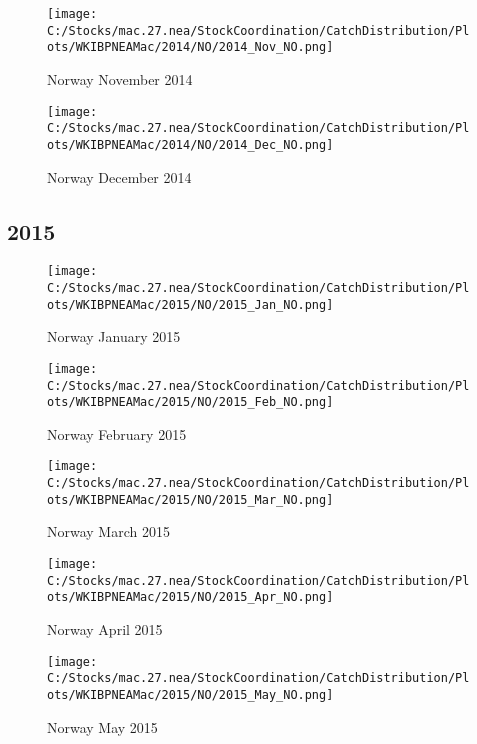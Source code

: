 \documentclass{article}
\begin{document}
\begin{figure}
	\centering
		\texttt{[image: C:/Stocks/mac.27.nea/StockCoordination/CatchDistribution/Plots/WKIBPNEAMac/2014/NO/2014\_Nov\_NO.png]}
	\caption{Norway November 2014}
	\label{fig:2014_Nov_NO}
\end{figure}

\begin{figure}
	\centering
		\texttt{[image: C:/Stocks/mac.27.nea/StockCoordination/CatchDistribution/Plots/WKIBPNEAMac/2014/NO/2014\_Dec\_NO.png]}
	\caption{Norway December 2014}
	\label{fig:2014_Dec_NO}
\end{figure}

\clearpage

\newpage

\subsection{2015}



\begin{figure}[h]
	\centering
		\texttt{[image: C:/Stocks/mac.27.nea/StockCoordination/CatchDistribution/Plots/WKIBPNEAMac/2015/NO/2015\_Jan\_NO.png]}
	\caption{Norway January 2015}
	\label{fig:2015_Jan_NO}
\end{figure}

\begin{figure}
	\centering
		\texttt{[image: C:/Stocks/mac.27.nea/StockCoordination/CatchDistribution/Plots/WKIBPNEAMac/2015/NO/2015\_Feb\_NO.png]}
	\caption{Norway February 2015}
	\label{fig:2015_Feb_NO}
\end{figure}

\begin{figure}
	\centering
		\texttt{[image: C:/Stocks/mac.27.nea/StockCoordination/CatchDistribution/Plots/WKIBPNEAMac/2015/NO/2015\_Mar\_NO.png]}
	\caption{Norway March 2015}
	\label{fig:2015_Mar_NO}
\end{figure}

\begin{figure}
	\centering
		\texttt{[image: C:/Stocks/mac.27.nea/StockCoordination/CatchDistribution/Plots/WKIBPNEAMac/2015/NO/2015\_Apr\_NO.png]}
	\caption{Norway April 2015}
	\label{fig:2015_Apr_NO}
\end{figure}

\begin{figure}
	\centering
		\texttt{[image: C:/Stocks/mac.27.nea/StockCoordination/CatchDistribution/Plots/WKIBPNEAMac/2015/NO/2015\_May\_NO.png]}
	\caption{Norway May 2015}
	\label{fig:2015_May_NO}
\end{figure}
\end{document}
